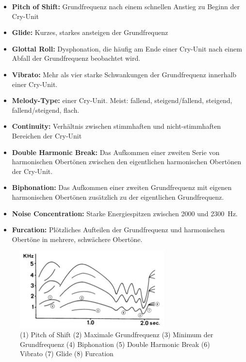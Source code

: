 \begin{itemize}
	\item \textbf{Pitch of Shift:} Grundfrequenz nach einem schnellen Anstieg zu Beginn der Cry-Unit
	\item \textbf{Glide:} Kurzes, starkes ansteigen der Grundfrequenz
	\item  \textbf{Glottal Roll:} Dysphonation, die häufig am Ende einer Cry-Unit nach einem Abfall der Grundfrequenz beobachtet wird.
	\item  \textbf{Vibrato:} Mehr als vier starke Schwankungen der Grundfrequenz innerhalb einer Cry-Unit.
	\item  \textbf{Melody-Type:} einer Cry-Unit. Meist: fallend, steigend/fallend, steigend, fallend/steigend, flach. 
	\item  \textbf{Continuity:} Verhältnis zwischen stimmhaften und nicht-stimmhaften Bereichen der Cry-Unit
	\item  \textbf{Double Harmonic Break:} Das Aufkommen einer zweiten Serie von harmonischen Obertönen zwischen den eigentlichen harmonischen Obertönen der Cry-Unit.
	\item  \textbf{Biphonation:} Das Aufkommen einer zweiten Grundfrequenz mit eigenen harmonischen Obertönen zusätzlich zu der eigentlichen Grundfrequenz.
	\item  \textbf{Noise Concentration:} Starke Energiespitzen zwischen 2000 und \SI{2300}{\hertz}.
	\item  \textbf{Furcation:} Plötzliches Aufteilen der Grundfrequenz und harmonischen Obertöne in mehrere, schwächere Obertöne.
\end{itemize}

\begin{figure}[H]
	\centering
	\includegraphics[width=0.7\textwidth]{bilder/melodyTypes.png}
	\caption{(1) Pitch of Shift (2) Maximale Grundfrequenz (3) Minimum der Grundfrequenz (4) Biphonation (5) Double Harmonic Break (6) Vibrato (7) Glide (8) Furcation \cite[S. 142]{signal}}
	\label{img:cryMelodies}
\end{figure}

